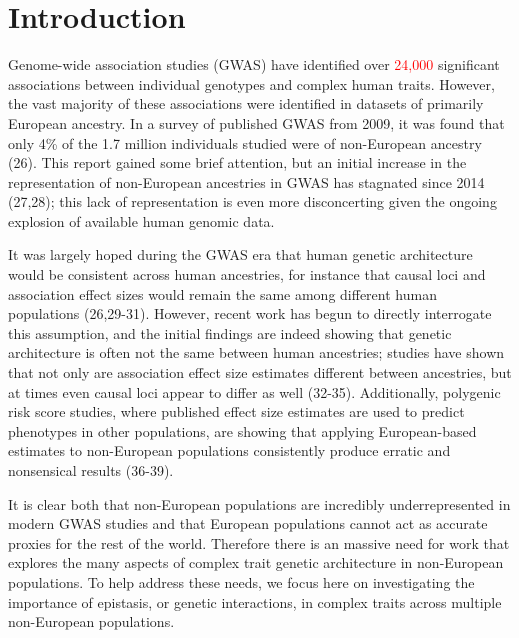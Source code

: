 \documentclass[12pt, a4paper]{article}
\begin{document}
\section{Introduction}\label{InterPath-Introduction}

Genome-wide association studies (GWAS) have identified over \textcolor{red}{24,000} significant associations between individual genotypes and complex human traits. However, the vast majority of these associations were identified in datasets of primarily European ancestry. In a survey of published GWAS from 2009, it was found that only 4\% of the 1.7 million individuals studied were of non-European ancestry (26). This report gained some brief attention, but an initial increase in the representation of non-European ancestries in GWAS has stagnated since 2014 (27,28); this lack of representation is even more disconcerting given the ongoing explosion of available human genomic data. 

It was largely hoped during the GWAS era that human genetic architecture would be consistent across human ancestries, for instance that causal loci and association effect sizes would remain the same among different human populations (26,29-31). However, recent work has begun to directly interrogate this assumption, and the initial findings are indeed showing that genetic architecture is often not the same between human ancestries; studies have shown that not only are association effect size estimates different between ancestries, but at times even causal loci appear to differ as well (32-35). Additionally, polygenic risk score studies, where published effect size estimates are used to predict phenotypes in other populations, are showing that applying European-based estimates to non-European populations consistently produce erratic and nonsensical results (36-39).

It is clear both that non-European populations are incredibly underrepresented in modern GWAS studies and that European populations cannot act as accurate proxies for the rest of the world. Therefore there is an massive need for work that explores the many aspects of complex trait genetic architecture in non-European populations. To help address these needs, we focus here on investigating the importance of epistasis, or genetic interactions, in complex traits across multiple non-European populations. 
\end{document}
